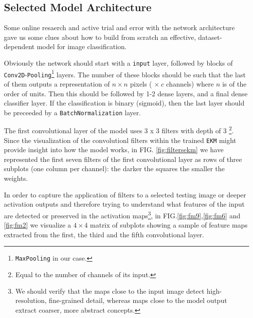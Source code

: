 \documentclass[aps,twocolumn,secnumarabic,nobalancelastpage,amsmath,amssymb,
nofootinbib]{revtex4}
\begin{document}
\subsection{Selected Model Architecture}\label{model-architecture}

Some online resaerch and active trial and error with the network
architecture gave us some clues about how to build from scratch an
effective, dataset-dependent model for image classification. 

Obviously the network should start with a \texttt{input} layer, followed by blocks of \texttt{Conv2D}-\texttt{Pooling}\footnote{\texttt{MaxPooling}
in our case.} layers. The number of these blocks should be such that
the last of them outputs a representation of \(n \times n\) pixels (
\(\times\: c\) channels) where \(n\) is of the order of units. Then this
should be followed by 1-2 dense layers, and a final dense classifier
layer. If the classification is binary (sigmoid), then the last layer
should be preceeded by a \texttt{BatchNormalization} layer.

The first convolutional layer of the model uses 3 x 3 filters with depth of 3 \footnote{Equal to the number of channels of its input.}. Since the visualization of the convolutionl filters within the trained \texttt{EKM} might provide insight into how the model works, in FIG.  \ref{fig:filtersekm} we have represented the first seven filters of the first convolutional layer as rows of three subplots (one column per channel): the darker the squares the smaller the weights.

In order to capture the application of filters to a selected testing image or deeper activation outputs and therefore trying to understand what features of the input are detected or preserved in the activation maps\footnote{We should verify that the maps close to the input image
detect high-resolution, fine-grained detail, whereas maps close to the
model output extract coarser, more abstract concepts.}, in FIG.\ref{fig:fm9},\ref{fig:fm6} and \ref{fig:fm2} we visualize a $4 \times 4$ matrix of subplots showing a sample of feature maps extracted from the first, the third and the fifth convolutional layer. 
\end{document}
